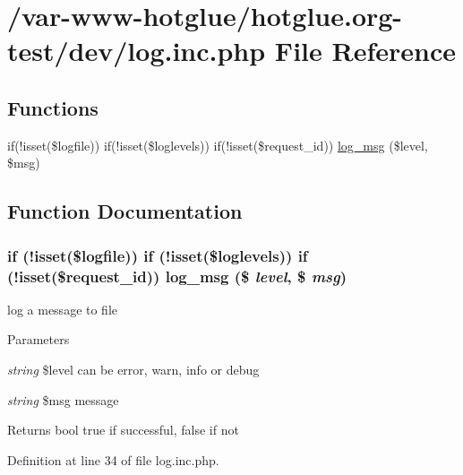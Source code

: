 \hypertarget{log_8inc_8php}{
\section{/var-\/www-\/hotglue/hotglue.org-\/test/dev/log.inc.php File Reference}
\label{log_8inc_8php}
}
\subsection*{Functions}
\begin{DoxyCompactItemize}
\item 
if(!isset(\$logfile)) if(!isset(\$loglevels)) if(!isset(\$request\_\-id)) \hyperlink{log_8inc_8php_a0d59d693ca96c65b67de4b197954ce60}{log\_\-msg} (\$level, \$msg)
\end{DoxyCompactItemize}


\subsection{Function Documentation}
\hypertarget{log_8inc_8php_a0d59d693ca96c65b67de4b197954ce60}{
\subsubsection[{log\_\-msg}]{\setlength{\rightskip}{0pt plus 5cm}if (!isset(\$logfile)) if (!isset(\$loglevels)) if (!isset(\$request\_\-id)) log\_\-msg (\$ {\em level}, \/  \$ {\em msg})}}
\label{log_8inc_8php_a0d59d693ca96c65b67de4b197954ce60}
log a message to file


\begin{DoxyParams}{Parameters}
\item[{\em string}]\$level can be error, warn, info or debug \item[{\em string}]\$msg message \end{DoxyParams}
\begin{DoxyReturn}{Returns}
bool true if successful, false if not 
\end{DoxyReturn}


Definition at line 34 of file log.inc.php.

